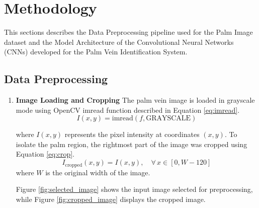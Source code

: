 \section{Methodology}
This sections describes the Data Preprocessing pipeline used for the Palm Image dataset and the Model Architecture of the Convolutional Neural Networks (CNNs) developed for the Palm Vein Identification System.

\subsection{Data Preprocessing}

\begin{enumerate}
    \item \textbf{Image Loading and Cropping}
    The palm vein image is loaded in grayscale mode using OpenCV imread function described in Equation \ref{eq:imread}. 
    \begin{equation}
        I(x, y) = \text{imread}(f, \text{GRAYSCALE})
        \label{eq:imread}
    \end{equation}

    where \( I(x, y) \) represents the pixel intensity at coordinates \( (x, y) \). 
    To isolate the palm region, the rightmost part of the image was cropped using Equation \ref{eq:crop}.
    \begin{equation}
        I_{\text{cropped}}(x, y) = I(x, y), \quad \forall \, x \in [0, W-120]
        \label{eq:crop}
    \end{equation} 
    where \( W \) is the original width of the image.
   
    Figure \ref{fig:selected_image} shows the input image selected for preprocessing, while Figure \ref{fig:cropped_image} displays the cropped image.


\end{enumerate}
